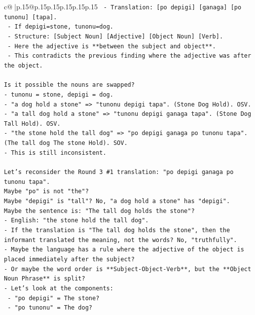 \documentclass{article}
\begin{document}
{\begin{supertabular}{c@{$\;$}|p{.15\linewidth}@{}p{.15\linewidth}p{.15\linewidth}p{.15\linewidth}p{.15\linewidth}p{.15\linewidth}}
{{{\texttt{  {-} Translation: {[}po depigi{]} {[}ganaga{]} {[}po tunonu{]} {[}tapa{]}.} \\
\texttt{  {-} If depigi=stone, tunonu=dog.} \\
\texttt{  {-} Structure: {[}Subject Noun{]} {[}Adjective{]} {[}Object Noun{]} {[}Verb{]}.} \\
\texttt{  {-} Here the adjective is **between the subject and object**.} \\
\texttt{  {-} This contradicts the previous finding where the adjective was after the object.} \\
\\ 
\texttt{Is it possible the nouns are swapped?} \\
\texttt{{-} tunonu = stone, depigi = dog.} \\
\texttt{{-} "a dog hold a stone" => "tunonu depigi tapa". (Stone Dog Hold). OSV.} \\
\texttt{{-} "a tall dog hold a stone" => "tunonu depigi ganaga tapa". (Stone Dog Tall Hold). OSV.} \\
\texttt{{-} "the stone hold the tall dog" => "po depigi ganaga po tunonu tapa". (The tall dog The stone Hold). SOV.} \\
\texttt{{-} This is still inconsistent.} \\
\\ 
\texttt{Let's reconsider the Round 3 \#1 translation: "po depigi ganaga po tunonu tapa".} \\
\texttt{Maybe "po" is not "the"?} \\
\texttt{Maybe "depigi" is "tall"? No, "a dog hold a stone" has "depigi".} \\
\texttt{Maybe the sentence is: "The tall dog holds the stone"?} \\
\texttt{{-} English: "the stone hold the tall dog".} \\
\texttt{{-} If the translation is "The tall dog holds the stone", then the informant translated the meaning, not the words? No, "truthfully".} \\
\texttt{{-} Maybe the language has a rule where the adjective of the object is placed immediately after the subject?} \\
\texttt{{-} Or maybe the word order is **Subject{-}Object{-}Verb**, but the **Object Noun Phrase** is split?} \\
\texttt{{-} Let's look at the components:} \\
\texttt{  {-} "po depigi" = The stone?} \\
\texttt{  {-} "po tunonu" = The dog?} \\
}}}
\end{supertabular}}
\end{document}
